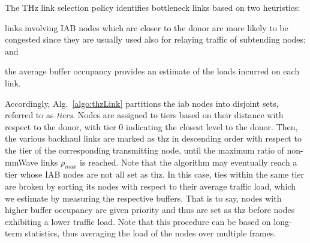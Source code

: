 The THz link selection policy 
identifies
bottleneck links based on two heuristics:
\begin{enumerate*}[label=\arabic*)]
    \item links involving IAB nodes which are closer to the donor are more likely to be congested since they are usually used also for relaying traffic of subtending nodes; and
    \item the average buffer occupancy provides an estimate of the loads incurred on each link.
\end{enumerate*}
Accordingly, Alg.~\ref{algo:thzLink} partitions the \gls{iab} nodes into disjoint sets, referred to as \textit{tiers}. Nodes are assigned to tiers based on their distance with respect to the donor, with tier $0$ indicating the closest level to the donor. 
Then, the various backhaul links are marked as \gls{thz} in descending order with respect to the tier of the corresponding transmitting node, until the maximum ratio of non-mmWave links $\rho_{max}$ is reached.
Note that the algorithm may eventually reach a tier whose IAB nodes are not all set as \gls{thz}. In this case, ties within the same tier are broken by sorting its nodes with respect to their average traffic load, which we estimate by measuring the respective buffers. That is to say, nodes with higher buffer occupancy are given priority and thus are set as \gls{thz} before nodes exhibiting a lower traffic load. Note that this procedure can be based on long-term statistics, thus averaging the load of the nodes over multiple frames.

